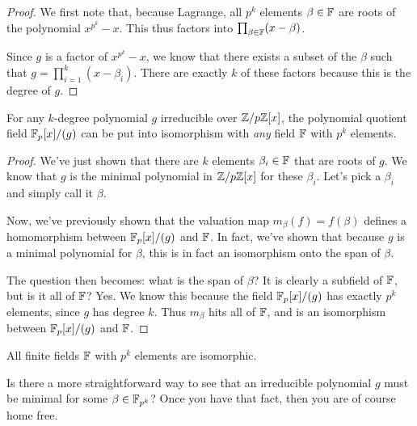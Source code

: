 \begin{proof}
  We first note that, because Lagrange, all $p^k$ elements $\beta \in
  \mathbb{F}$ are roots of the polynomial $x^{p^k} - x$. This thus factors into
  $\prod_{\beta\in\mathbb{F}} (x - \beta)$.

  Since $g$ is a factor of $x^{p^k} - x$, we know that there exists a
  subset of the $\beta$ such that $g = \prod_{i=1}^k (x - \beta_i)$.
  There are exactly $k$ of these factors because this is the degree of
  $g$.
\end{proof}

\begin{theorem}
  For any $k$-degree polynomial $g$ irreducible over $\mathbb{Z} / p\mathbb{Z}[x]$, the
  polynomial quotient field $\mathbb{F}_p[x]/(g)$ can be put into isomorphism with
  \emph{any} field $\mathbb{F}$ with $p^k$ elements.
\end{theorem}

\begin{proof}
  We've just shown that there are $k$ elements $\beta_i \in \mathbb{F}$ that are
  roots of $g$. We know that $g$ is the minimal polynomial in
  $\mathbb{Z} / p\mathbb{Z}[x]$ for these $\beta_i$. Let's pick a $\beta_i$ and simply
  call it $\beta$.

  Now, we've previously shown that the valuation map $m_\beta(f) =
  f(\beta)$ defines a homomorphism between $\mathbb{F}_p[x]/(g)$ and $\mathbb{F}$. In fact,
  we've shown that because $g$ is a minimal polynomial for $\beta$, this
  is in fact an isomorphism onto the span of $\beta$.

  The question then becomes: what is the span of $\beta$? It is clearly
  a subfield of $\mathbb{F}$, but is it all of $\mathbb{F}$? Yes. We know this because
  the field $\mathbb{F}_p[x]/(g)$ has exactly $p^k$ elements, since $g$ has degree
  $k$. Thus $m_\beta$ hits all of $\mathbb{F}$, and is an isomorphism between
  $\mathbb{F}_p[x]/(g)$ and $\mathbb{F}$.
\end{proof}

\begin{corollary}
  All finite fields $\mathbb{F}$ with $p^k$ elements are isomorphic.
\end{corollary}

\begin{remark}
   Is there a more
  straightforward way to see that an irreducible polynomial $g$ must be
  minimal for some $\beta \in \mathbb{F}_{p^k}$? Once you have that fact, then
  you are of course home free.
\end{remark}

